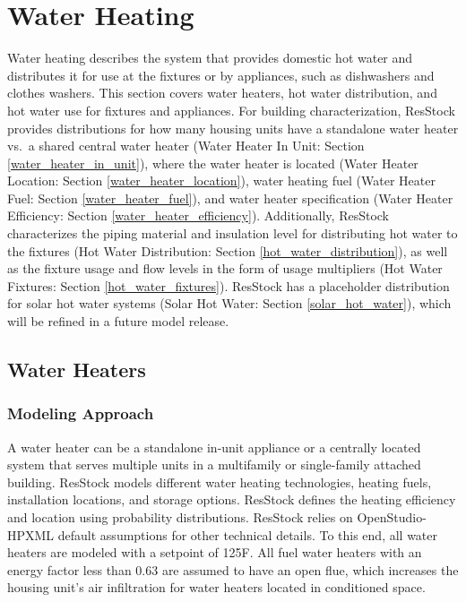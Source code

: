\section{Water Heating} 
Water heating describes the system that provides domestic hot water and distributes it for use at the fixtures or by appliances, such as dishwashers and clothes washers. This section covers water heaters, hot water distribution, and hot water use for fixtures and appliances. For building characterization, ResStock provides distributions for how many housing units have a standalone water heater vs.~a shared central water heater (Water Heater In Unit: Section \ref{water_heater_in_unit}), where the water heater is located (Water Heater Location: Section \ref{water_heater_location}), water heating fuel (Water Heater Fuel: Section \ref{water_heater_fuel}), and water heater specification (Water Heater Efficiency: Section \ref{water_heater_efficiency}). Additionally, ResStock characterizes the piping material and insulation level for distributing hot water to the fixtures (Hot Water Distribution: Section \ref{hot_water_distribution}), as well as the fixture usage and flow levels in the form of usage multipliers (Hot Water Fixtures: Section \ref{hot_water_fixtures}). ResStock has a placeholder distribution for solar hot water systems (Solar Hot Water: Section \ref{solar_hot_water}), which will be refined in a future model release.

\subsection{Water Heaters}
\subsubsection{Modeling Approach}
A water heater can be a standalone in-unit appliance or a centrally located system that serves multiple units in a multifamily or single-family attached building. ResStock models different water heating technologies, heating fuels, installation locations, and storage options. ResStock defines the heating efficiency and location using probability distributions. ResStock relies on OpenStudio-HPXML default assumptions for other technical details. To this end, all water heaters are modeled with a setpoint of 125\degree F. All fuel water heaters with an energy factor less than 0.63 are assumed to have an open flue, which increases the housing unit’s air infiltration for water heaters located in conditioned space. 

